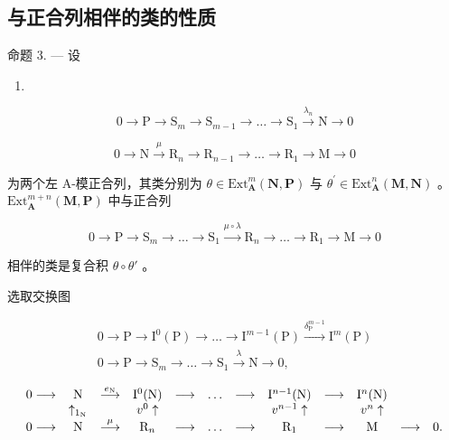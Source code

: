\subsection{与正合列相伴的类的性质}

命题 3. --- 设

\begin{enumerate}
\def\labelenumi{(\arabic{enumi})}
\setcounter{enumi}{5}
\tightlist
\item
\end{enumerate}

\[
0 \rightarrow \mathrm{P} \rightarrow \mathrm{S} _ {m} \rightarrow \mathrm{S} _ {m - 1} \rightarrow \dots \rightarrow \mathrm{S} _ {1} \stackrel {\lambda_ {n}} {\rightarrow} \mathrm{N} \rightarrow 0\tag{7}
\]

\[
0 \rightarrow \mathrm{N} \xrightarrow {\mu} \mathrm{R} _ {n} \rightarrow \mathrm{R} _ {n - 1} \rightarrow \dots \rightarrow \mathrm{R} _ {1} \rightarrow \mathrm{M} \rightarrow 0
\]

为两个左 A-模正合列，其类分别为 \(\theta\in\mathrm{Ext}_{\mathbf{A}}^{m}(\mathbf{N},\mathbf{P})\) 与 \(\theta^{\prime}\in\mathrm{Ext}_{\mathbf{A}}^{n}(\mathbf{M},\mathbf{N})\) 。 \(\mathrm{Ext}_{\mathbf{A}}^{m+n}(\mathbf{M},\mathbf{P})\) 中与正合列

\[
0 \to \mathrm{P} \to \mathrm{S} _ {m} \to \dots \to \mathrm{S} _ {1} \xrightarrow {\mu \circ \lambda} \mathrm{R} _ {n} \to \dots \to \mathrm{R} _ {1} \to \mathrm{M} \to 0\tag{8}
\]

相伴的类是复合积 \(\theta\circ\theta'\) 。

选取交换图

\[
\begin{array}{c} 0 \longrightarrow \mathrm{P} \longrightarrow \mathrm{I} ^ {0} (\mathrm{P}) \longrightarrow \dots \longrightarrow \mathrm{I} ^ {m - 1} (\mathrm{P}) \xrightarrow {\delta_ {\mathrm{P}} ^ {m - 1}} \mathrm{I} ^ {m} (\mathrm{P}) \\ 0 \longrightarrow \mathrm{P} \longrightarrow \mathrm{S} _ {m} \longrightarrow \dots \longrightarrow \mathrm{S} _ {1} \xrightarrow {\lambda} \mathrm{N} \longrightarrow 0, \end{array}
\]

\[
\begin{array}{c c c c c c c c c c c c} 0 \longrightarrow & \mathrm{N} & \stackrel {{e _ {\mathrm{N}}}} {{\longrightarrow}} & \mathrm{I} ^ {0} (\mathrm{N}) & \longrightarrow & \dots & \longrightarrow & \mathrm{I} ^ {n - 1} (\mathrm{N}) & \longrightarrow & \mathrm{I} ^ {n} (\mathrm{N}) \\ & \uparrow_ {1 _ {\mathrm{N}}} & & v ^ {0} \uparrow & & & & v ^ {n - 1} \uparrow & & v ^ {n} \uparrow \\ 0 \longrightarrow & \mathrm{N} & \stackrel {{\mu}} {{\longrightarrow}} & \mathrm{R} _ {n} & \longrightarrow & \dots & \longrightarrow & \mathrm{R} _ {1} & \longrightarrow & \mathrm{M} & \longrightarrow & 0. \end{array}
\]

